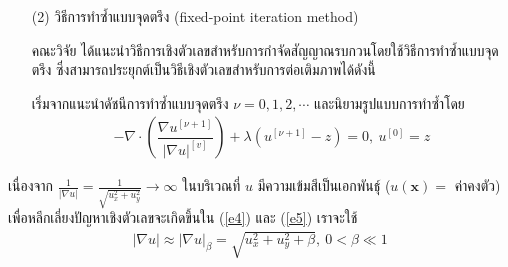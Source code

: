 \documentclass[hidelinks, a4paper,12pt]{article}
\numberwithin{equation}{section}							%
\numberwithin{equation}{section}
\begin{document}
{\begin{itemize}
	 วิธีเดินเวลาแบบชัดแจ้งสำหรับภาพเฉดเทามีขั้นตอนวิธีดังนี้ 
	\begin{algorithm}[H]
		\caption{ETM Method for TV-based Image Inpainting}		
	\end{algorithm}
	
	\item [(2)] วิธีการทำซ้ำแบบจุดตรึง (fixed-point iteration method)
	
	คณะวิจัย \cite{ref:FixpointSolver} ได้แนะนำวิธีการเชิงตัวเลขสำหรับการกำจัดสัญญาณรบกวนโดยใช้วิธีการทำซ้ำแบบจุดตรึง ซึ่งสามารถประยุกต์เป็นวิธีเชิงตัวเลขสำหรับการต่อเติมภาพได้ดังนี้
	
	\hspace{1cm} เริ่มจากแนะนำดัชนีการทำซ้ำแบบจุดตรึง $\nu=0,1,2,\cdots$ และนิยามรูปแบบการทำซ้ำโดย
	\begin{align}
	- \nabla\cdot\left(\dfrac{\nabla u^{[\nu+1]}}{{| \nabla u |}^{[v]} }\right) + \lambda(u^{[\nu+1]}-z)  = 0,\ u^{[0]}=z
	\label{e5}
	\end{align}
\end{itemize}

\hspace{1cm} เนื่องจาก $\tfrac{1}{| \nabla u |}=\tfrac{1}{\sqrt{u_x^2+u_y^2}} \rightarrow \infty$ ในบริเวณที่ $u$ มีความเข้มสีเป็นเอกพันธ์ุ ($u(\mathbf{x})=$ ค่าคงตัว) เพื่อหลีกเลี่ยงปัญหาเชิงตัวเลขจะเกิดขึ้นใน (\ref{e4}) และ (\ref{e5}) เราจะใช้ 
\begin{align*}
|\nabla u| \approx| \nabla u |_\beta=\sqrt{u_x^2+u_y^2+\beta},\ 0< \beta \ll 1
 \end{align*}

}
\end{document}
